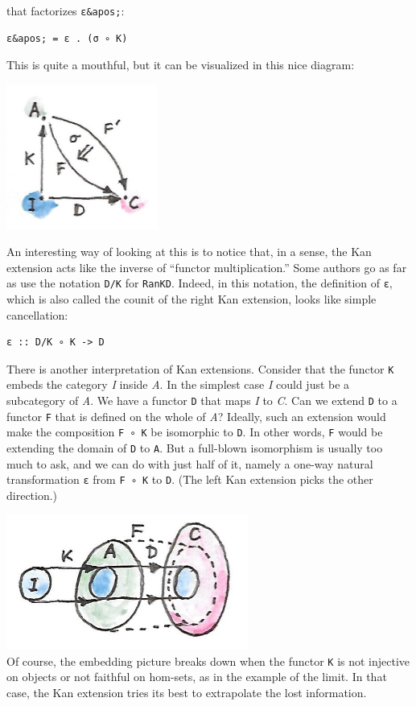 that factorizes \texttt{ε\&apos;}:

\begin{verbatim}
ε&apos; = ε . (σ ∘ K)
\end{verbatim}

This is quite a mouthful, but it can be visualized in this nice diagram:

\includegraphics[width=1.95833in]{images/kan7.jpg}

An interesting way of looking at this is to notice that, in a sense, the
Kan extension acts like the inverse of ``functor multiplication.'' Some
authors go as far as use the notation \texttt{D/K} for \texttt{RanKD}.
Indeed, in this notation, the definition of \texttt{ε}, which is also
called the counit of the right Kan extension, looks like simple
cancellation:

\begin{verbatim}
ε :: D/K ∘ K -> D
\end{verbatim}

There is another interpretation of Kan extensions. Consider that the
functor \texttt{K} embeds the category \emph{I} inside \emph{A}. In the
simplest case \emph{I} could just be a subcategory of \emph{A}. We have
a functor \texttt{D} that maps \emph{I} to \emph{C}. Can we extend
\texttt{D} to a functor \texttt{F} that is defined on the whole of
\emph{A}? Ideally, such an extension would make the composition
\texttt{F\ ∘\ K} be isomorphic to \texttt{D}. In other words, \texttt{F}
would be extending the domain of \texttt{D} to \texttt{A}. But a
full-blown isomorphism is usually too much to ask, and we can do with
just half of it, namely a one-way natural transformation \texttt{ε} from
\texttt{F\ ∘\ K} to \texttt{D}. (The left Kan extension picks the other
direction.)

\includegraphics[width=3.12500in]{images/kan6.jpg}\\
Of course, the embedding picture breaks down when the functor \texttt{K}
is not injective on objects or not faithful on hom-sets, as in the
example of the limit. In that case, the Kan extension tries its best to
extrapolate the lost information.


